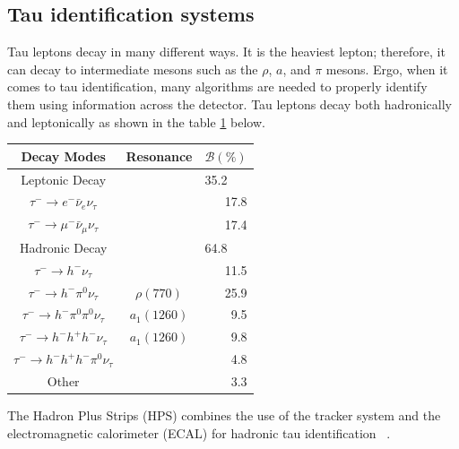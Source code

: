 \subsection{Tau identification systems}
Tau leptons decay in many different ways. It is the heaviest lepton; therefore, it can decay to intermediate mesons such as the $\rho$, $a$, and $\pi$ mesons.
Ergo, when it comes to tau identification, many algorithms are needed to properly identify them using information across the detector. 
Tau leptons decay both hadronically and leptonically as shown in the table \ref{tab:taudecay} below. 



\begin{table}[h!tbp]
\centering
\label{tab:taudecay}
\begin{tabular}{c c r}
Decay Modes & Resonance & \multicolumn{1}{c}{$\mathcal{B}(\%)$} \\\hline
Leptonic Decay && \multicolumn{1}{l}{35.2}\\
$\tau^- \rightarrow e^- \bar{\nu}_e \nu_\tau $ & & 17.8 \\
$\tau^- \rightarrow \mu^- \bar{\nu}_\mu \nu_\tau$ & & 17.4 \\\hline
Hadronic Decay && \multicolumn{1}{l}{64.8}\\
$\tau^- \rightarrow h^-\nu_\tau$ & & 11.5 \\
$\tau^- \rightarrow h^-\pi^0 \nu_\tau$ & $\rho(770)$ & 25.9 \\
$\tau^- \rightarrow h^-\pi^0 \pi^0 \nu_\tau$ & $a_1(1260)$ & 9.5 \\
$\tau^- \rightarrow h^- h^+ h^- \nu_\tau$ & $a_1(1260)$ & 9.8 \\
$\tau^- \rightarrow h^- h^+ h^- \pi^0 \nu_\tau$ & & 4.8 \\
Other & & 3.3 \\\hline
\end{tabular}
\end{table}


The Hadron Plus Strips (HPS) combines the use of the tracker system and the electromagnetic calorimeter (ECAL) for hadronic tau identification ~\cite{Sirunyan_2018}.  


